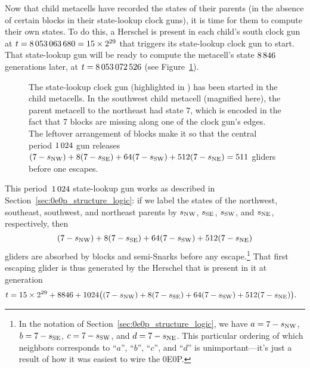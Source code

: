 Now that child metacells have recorded the states of their parents (in the absence of certain blocks in their state-lookup clock guns), it is time for them to compute their own states. To do this, a Herschel is present in each child's south clock gun at $t = 8{\,}053{\,}063{\,}680 = 15 \times 2^{29}$ that triggers its state-lookup clock gun to start. That state-lookup gun will be ready to compute the metacell's state $8{\,}846$ generations later, at $t = 8{\,}053{\,}072{\,}526$ (see Figure~\ref{fig:0e0p_timeline_8053072526}).

\begin{figure}[!htb]
	\centering
	\caption{The state-lookup clock gun (highlighted in ) has been started in the child metacells. In the southwest child metacell (magnified here), the parent metacell to the northeast had state $7$, which is encoded in the fact that $7$ blocks are missing along one of the clock gun's edges. The leftover arrangement of blocks make it so that the central period $1{\,}024$ gun releases $(7-s_{\textup{NW}}) + 8(7-s_{\textup{SE}}) + 64(7-s_{\textup{SW}}) + 512(7-s_{\textup{NE}}) = 511$ gliders before one escapes.}
	\label{fig:0e0p_timeline_8053072526}
\end{figure}

This period~$1{\,}024$ state-lookup gun works as described in Section~\ref{sec:0e0p_structure_logic}: if we label the states of the northwest, southeast, southwest, and northeast parents by $s_{\textup{NW}}$, $s_{\textup{SE}}$, $s_{\textup{SW}}$, and $s_{\textup{NE}}$, respectively, then
\[
	(7-s_{\textup{NW}}) + 8(7-s_{\textup{SE}}) + 64(7-s_{\textup{SW}}) + 512(7-s_{\textup{NE}})
\]
gliders are absorbed by blocks and semi-Snarks before any escape.\footnote{In the notation of Section~\ref{sec:0e0p_structure_logic}, we have $a = 7-s_{\textup{NW}}$, $b = 7-s_{\textup{SE}}$, $c = 7-s_{\textup{SW}}$, and $d = 7-s_{\textup{NE}}$. This particular ordering of which neighbors corresponds to ``$a$'', ``$b$'', ``$c$'', and ``$d$'' is unimportant---it's just a result of how it was easiest to wire the 0E0P.} That first escaping glider is thus generated by the Herschel that is present in it at generation
\begin{align*}
	t & = 15 \times 2^{29} + 8846 + 1024\big((7-s_{\textup{NW}}) + 8(7-s_{\textup{SE}}) + 64(7-s_{\textup{SW}}) + 512(7-s_{\textup{NE}})\big).
\end{align*}

